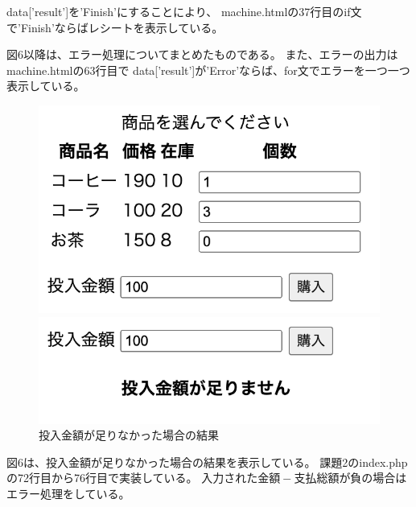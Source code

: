 \documentclass[12pt]{jarticle}
\begin{document}
data['result']を'Finish'にすることにより、
machine.htmlの37行目のif文で'Finish'ならばレシートを表示している。

図6以降は、エラー処理についてまとめたものである。
また、エラーの出力はmachine.htmlの63行目で
data['result']が'Error'ならば、for文でエラーを一つ一つ表示している。
\begin{figure}[h]
    \begin{minipage}{0.5\hsize}
        \begin{center}
            \includegraphics[scale=0.4]{kadai2_2_4.png}
        \end{center}
    \end{minipage}
    \begin{minipage}{0.5\hsize}
        \begin{center}
            \includegraphics[scale=0.4]{kadai2_2_5.png}
        \end{center}
    \end{minipage}
    \caption{投入金額が足りなかった場合の結果}
\end{figure}

図6は、投入金額が足りなかった場合の結果を表示している。
課題2のindex.phpの72行目から76行目で実装している。
$入力された金額-支払総額$が負の場合はエラー処理をしている。
\clearpage
\end{document}
